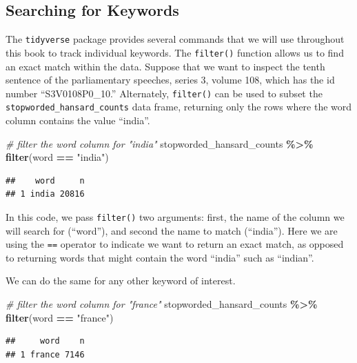 \documentclass[
]{article}
\newenvironment{Shaded}{\begin{snugshade}}{\end{snugshade}}
\newcommand{\CommentTok}[1]{\textcolor[rgb]{0.56,0.35,0.01}{\textit{#1}}}
\newcommand{\FunctionTok}[1]{\textcolor[rgb]{0.13,0.29,0.53}{\textbf{#1}}}
\newcommand{\NormalTok}[1]{#1}
\newcommand{\SpecialCharTok}[1]{\textcolor[rgb]{0.81,0.36,0.00}{\textbf{#1}}}
\newcommand{\StringTok}[1]{\textcolor[rgb]{0.31,0.60,0.02}{#1}}
\begin{document}
\subsection{Searching for Keywords}\label{searching-for-keywords}

The \texttt{tidyverse} package provides several commands that we will
use throughout this book to track individual keywords. The
\texttt{filter()} function allows us to find an exact match within the
data. Suppose that we want to inspect the tenth sentence of the
parliamentary speeches, series 3, volume 108, which has the id number
``S3V0108P0\_10.'' Alternately, \texttt{filter()} can be used to subset
the \texttt{stopworded\_hansard\_counts} data frame, returning only the
rows where the word column contains the value ``india''.

\begin{Shaded}
\begin{Highlighting}[]
\CommentTok{\# filter the word column for "india"}
\NormalTok{stopworded\_hansard\_counts }\SpecialCharTok{\%\textgreater{}\%} 
  \FunctionTok{filter}\NormalTok{(word }\SpecialCharTok{==} \StringTok{"india"}\NormalTok{)}
\end{Highlighting}
\end{Shaded}

\begin{verbatim}
##    word     n
## 1 india 20816
\end{verbatim}

In this code, we pass \texttt{filter()} two arguments: first, the name
of the column we will search for (``word''), and second the name to
match (``india''). Here we are using the \texttt{==} operator to
indicate we want to return an exact match, as opposed to returning words
that might contain the word ``india'' such as ``indian''.

We can do the same for any other keyword of interest.

\begin{Shaded}
\begin{Highlighting}[]
\CommentTok{\# filter the word column for "france"}
\NormalTok{stopworded\_hansard\_counts }\SpecialCharTok{\%\textgreater{}\%} 
  \FunctionTok{filter}\NormalTok{(word }\SpecialCharTok{==} \StringTok{"france"}\NormalTok{)}
\end{Highlighting}
\end{Shaded}

\begin{verbatim}
##     word    n
## 1 france 7146
\end{verbatim}
\end{document}

